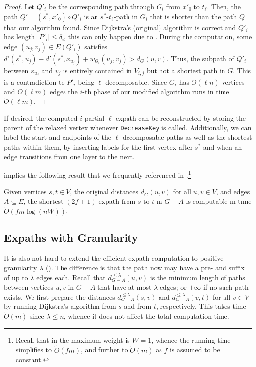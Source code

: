 \documentclass{article}\usepackage[a4paper,margin=20mm]{geometry}
\newcommand*{\Otilde}{\widetilde{O}}
\newcommand*{\length}[1]{|#1|}
\renewcommand{\le}{\leqslant}
\begin{document}
\begin{proof}
Let $Q'_i$ be the corresponding path through $G_i$ from $x'_0$ to $t_{\ell}$.
Then, the path $Q' = (s^*, x'_0) \circ Q'_i$ is an $s^*$-$t_{\ell}$-path in $G_i$ 
that is shorter than the path $Q$ that our algorithm found.
Since Dijkstra's (original) algorithm is correct and $Q'_i$ has length $\length{P'_i} \le \delta_i$, this can only happen due to .
During the computation, some edge $(u_j,v_j) \in E(Q'_i)$ 
satisfies $d'(s^*,u_j) - d'(s^*,x_{u_j}) + w_{G_i}(u_j,v_j) > d_G(u,v)$.
Thus, the subpath of $Q'_i$ between $x_{u_j}$ and $v_j$ is 
entirely contained in $V_{i,j}$ but not a shortest path in $G$.
This is a contradiction to $P'_i$ being $\ell$-decomposable.
%
Since $G_i$ has $O(\ell n)$ vertices and $O(\ell m)$ edges the $i$-th phase of
our modified algorithm runs in time $\Otilde(\ell m)$.
\end{proof}

If desired, the computed $i$-partial $\ell$-expath can be reconstructed by storing the parent of the relaxed vertex whenever \texttt{DecreaseKey} is called.
Additionally, we can label the start and endpoints of the $\ell$-decomposable paths 
as well as the shortest paths within them, by inserting labels for the first vertex after $s^*$
and when an edge transitions from one layer to the next.


 implies the following result
that we frequently referenced in .\footnote{%
	Recall that in 
	the maximum weight is $W = 1$, whence the running time simplifies to $\Otilde(fm)$,
	and further to $\Otilde(m)$ as $f$ is assumed to be constant.
}

\begin{corollary}
Given vertices $s,t \in V$, the original distances $d_G(u,v)$ for all $u,v \in V$,
and edges $A \subseteq E$, the shortest $(2f{+}1)$-expath from $s$ to $t$ in $G{-}A$
is computable in time $\Otilde(fm \log(nW))$.
\end{corollary}


\subsection{Expaths with Granularity}
\label{subsec:improved_preproc_granularity}

It is also not hard to extend the efficient expath computation to positive granularity $\lambda$
().
The difference is that the path now may have a pre- and suffix of up to $\lambda$ edges each.
Recall that $d_{G-A}^{\le \lambda}(u,v)$ is the minimum length of paths 
between vertices $u,v$ in $G-A$
that have at most $\lambda$ edges; or $+\infty$ if no such path exists.
We first prepare the distances $d_{G-A}^{\le \lambda}(s,v)$
and $d_{G-A}^{\le \lambda}(v,t)$ for all $v \in V$ by running Dijkstra's algorithm
from $s$ and from $t$, respectively.
This takes time $\Otilde(m)$ since $\lambda \le n$,
whence it does not affect the total computation time.
\end{document}
